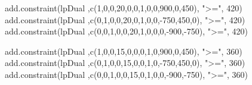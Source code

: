 \documentclass[
]{article}
\newenvironment{Shaded}{\begin{snugshade}}{\end{snugshade}}
\newcommand{\DecValTok}[1]{\textcolor[rgb]{0.00,0.00,0.81}{#1}}
\newcommand{\FunctionTok}[1]{\textcolor[rgb]{0.00,0.00,0.00}{#1}}
\newcommand{\NormalTok}[1]{#1}
\newcommand{\SpecialCharTok}[1]{\textcolor[rgb]{0.00,0.00,0.00}{#1}}
\newcommand{\StringTok}[1]{\textcolor[rgb]{0.31,0.60,0.02}{#1}}
\begin{document}
\begin{Shaded}
\begin{Highlighting}[]
\FunctionTok{add.constraint}\NormalTok{(lpDual ,}\FunctionTok{c}\NormalTok{(}\DecValTok{1}\NormalTok{,}\DecValTok{0}\NormalTok{,}\DecValTok{0}\NormalTok{,}\DecValTok{20}\NormalTok{,}\DecValTok{0}\NormalTok{,}\DecValTok{0}\NormalTok{,}\DecValTok{1}\NormalTok{,}\DecValTok{0}\NormalTok{,}\DecValTok{0}\NormalTok{,}\DecValTok{900}\NormalTok{,}\DecValTok{0}\NormalTok{,}\DecValTok{450}\NormalTok{), }\StringTok{"\textgreater{}="}\NormalTok{, }\DecValTok{420}\NormalTok{)}
\FunctionTok{add.constraint}\NormalTok{(lpDual ,}\FunctionTok{c}\NormalTok{(}\DecValTok{0}\NormalTok{,}\DecValTok{1}\NormalTok{,}\DecValTok{0}\NormalTok{,}\DecValTok{0}\NormalTok{,}\DecValTok{20}\NormalTok{,}\DecValTok{0}\NormalTok{,}\DecValTok{1}\NormalTok{,}\DecValTok{0}\NormalTok{,}\DecValTok{0}\NormalTok{,}\SpecialCharTok{{-}}\DecValTok{750}\NormalTok{,}\DecValTok{450}\NormalTok{,}\DecValTok{0}\NormalTok{), }\StringTok{"\textgreater{}="}\NormalTok{, }\DecValTok{420}\NormalTok{)}
\FunctionTok{add.constraint}\NormalTok{(lpDual ,}\FunctionTok{c}\NormalTok{(}\DecValTok{0}\NormalTok{,}\DecValTok{0}\NormalTok{,}\DecValTok{1}\NormalTok{,}\DecValTok{0}\NormalTok{,}\DecValTok{0}\NormalTok{,}\DecValTok{20}\NormalTok{,}\DecValTok{1}\NormalTok{,}\DecValTok{0}\NormalTok{,}\DecValTok{0}\NormalTok{,}\DecValTok{0}\NormalTok{,}\SpecialCharTok{{-}}\DecValTok{900}\NormalTok{,}\SpecialCharTok{{-}}\DecValTok{750}\NormalTok{), }\StringTok{"\textgreater{}="}\NormalTok{, }\DecValTok{420}\NormalTok{)}

\FunctionTok{add.constraint}\NormalTok{(lpDual ,}\FunctionTok{c}\NormalTok{(}\DecValTok{1}\NormalTok{,}\DecValTok{0}\NormalTok{,}\DecValTok{0}\NormalTok{,}\DecValTok{15}\NormalTok{,}\DecValTok{0}\NormalTok{,}\DecValTok{0}\NormalTok{,}\DecValTok{0}\NormalTok{,}\DecValTok{1}\NormalTok{,}\DecValTok{0}\NormalTok{,}\DecValTok{900}\NormalTok{,}\DecValTok{0}\NormalTok{,}\DecValTok{450}\NormalTok{), }\StringTok{"\textgreater{}="}\NormalTok{, }\DecValTok{360}\NormalTok{)}
\FunctionTok{add.constraint}\NormalTok{(lpDual ,}\FunctionTok{c}\NormalTok{(}\DecValTok{0}\NormalTok{,}\DecValTok{1}\NormalTok{,}\DecValTok{0}\NormalTok{,}\DecValTok{0}\NormalTok{,}\DecValTok{15}\NormalTok{,}\DecValTok{0}\NormalTok{,}\DecValTok{0}\NormalTok{,}\DecValTok{1}\NormalTok{,}\DecValTok{0}\NormalTok{,}\SpecialCharTok{{-}}\DecValTok{750}\NormalTok{,}\DecValTok{450}\NormalTok{,}\DecValTok{0}\NormalTok{), }\StringTok{"\textgreater{}="}\NormalTok{, }\DecValTok{360}\NormalTok{)}
\FunctionTok{add.constraint}\NormalTok{(lpDual ,}\FunctionTok{c}\NormalTok{(}\DecValTok{0}\NormalTok{,}\DecValTok{0}\NormalTok{,}\DecValTok{1}\NormalTok{,}\DecValTok{0}\NormalTok{,}\DecValTok{0}\NormalTok{,}\DecValTok{15}\NormalTok{,}\DecValTok{0}\NormalTok{,}\DecValTok{1}\NormalTok{,}\DecValTok{0}\NormalTok{,}\DecValTok{0}\NormalTok{,}\SpecialCharTok{{-}}\DecValTok{900}\NormalTok{,}\SpecialCharTok{{-}}\DecValTok{750}\NormalTok{), }\StringTok{"\textgreater{}="}\NormalTok{, }\DecValTok{360}\NormalTok{)}


\end{Highlighting}
\end{Shaded}
\end{document}
